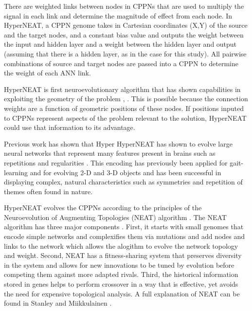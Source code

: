There are weighted links between nodes in CPPNs that are used to multiply the signal in each link and determine the magnitude of effect from each node. 
In HyperNEAT, a CPPN genome takes in Cartesian coordinates (X,Y) of the source and the target nodes, and a constant bias value and outputs the weight between the input and hidden layer and a weight between the hidden layer and output (assuming that there is a hidden layer, as in the case for this study). 
All pairwise combinations of source and target nodes are passed into a CPPN to determine the weight of each ANN link. 


HyperNEAT is first neuroevolutionary algorithm that has shown capabilities in exploiting the geometry of the problem \cite{stanley2009hypercube}, \cite{clune2009sensitivity}.
This is possible because the connection weights are a function of geometric positions of these nodes. 
If positions inputed to CPPNs represent aspects of the problem relevant to the solution, HyperNEAT could use that information to its advantage.  

Previous work has shown that Hyper
HyperNEAT has shown to evolve large neural networks that represent many features present in brains such as repetitions and regularities . 
This encoding has previously been applied for gait-learning \cite{yos:clune} and for evolving 2-D and 3-D objects \cite{clune:lipson} and has been successful in displaying complex, natural characteristics such as symmetries and repetition of themes often found in nature.


HyperNEAT evolves the CPPNs according to the principles of the Neuroevolution of Augmenting Topologies (NEAT) algorithm \cite{stanley2006exploiting}. 
The NEAT algorithm has three major components \cite{stanley2006exploiting}. 
First, it starts with small genomes that encode simple networks and complexifies them via mutations and add nodes and links to the network which allows the alogithm to evolve the network topology and weight. 
Second, NEAT has a fitness-sharing system that preserves diversity in the system and allows for new innovations to be tuned by evolution before competing them against more adapted rivals. 
Third, the historical information stored in genes helps to perform crossover in a way that is effective, yet avoids the need for expensive topological analysis. A full explanation of NEAT can be found in Stanley and Miikkulainen \cite{stanley2006exploiting}. 


